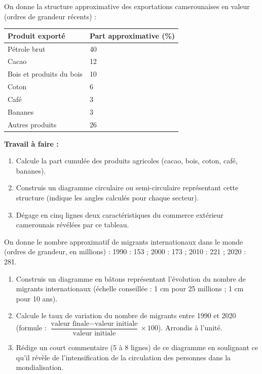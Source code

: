 \documentclass[11pt]{article}
\begin{document}
\begin{exercice}
On donne la structure approximative des exportations camerounaises en valeur (ordres de grandeur récents) :
\begin{center}
\begin{tabularx}{\linewidth}{|l|X|}\hline
\rowcolor{popblueL} \textbf{Produit exporté} & \textbf{Part approximative (\%)} \\ \hline
Pétrole brut & 40 \\ \hline
Cacao & 12 \\ \hline
Bois et produits du bois & 10 \\ \hline
Coton & 6 \\ \hline
Café & 3 \\ \hline
Bananes & 3 \\ \hline
Autres produits & 26 \\ \hline
\end{tabularx}
\end{center}
\textbf{Travail à faire :}
\begin{enumerate}
\item Calcule la part cumulée des produits agricoles (cacao, bois, coton, café, bananes).
\item Construis un diagramme circulaire ou semi-circulaire représentant cette structure (indique les angles calculés pour chaque secteur).
\item Dégage en cinq lignes deux caractéristiques du commerce extérieur camerounais révélées par ce tableau.
\end{enumerate}
\end{exercice}

\begin{exercice}
On donne le nombre approximatif de migrants internationaux dans le monde (ordres de grandeur, en millions) : 1990 : 153 ; 2000 : 173 ; 2010 : 221 ; 2020 : 281.
\begin{enumerate}
\item Construis un diagramme en bâtons représentant l'évolution du nombre de migrants internationaux (échelle conseillée : 1 cm pour 25 millions ; 1 cm pour 10 ans).
\item Calcule le taux de variation du nombre de migrants entre 1990 et 2020 (formule : $\dfrac{\text{valeur finale} - \text{valeur initiale}}{\text{valeur initiale}} \times 100$). Arrondis à l'unité.
\item Rédige un court commentaire (5 à 8 lignes) de ce diagramme en soulignant ce qu'il révèle de l'intensification de la circulation des personnes dans la mondialisation.
\end{enumerate}
\end{exercice}
\end{document}
